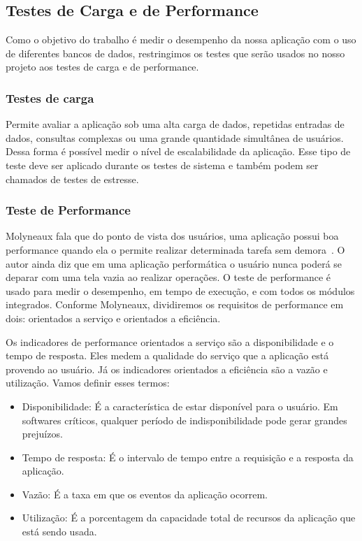 \subsection{Testes de Carga e de Performance}

Como o objetivo do trabalho é medir o desempenho da nossa aplicação com o uso de diferentes bancos de dados, restringimos os testes que serão usados no nosso projeto aos testes de carga e de performance.

\subsubsection{Testes de carga}

Permite avaliar a aplicação sob uma alta carga de dados, repetidas entradas de dados, consultas complexas ou uma grande quantidade simultânea de usuários. Dessa forma é possível medir o nível de escalabilidade da aplicação. Esse tipo de teste deve ser aplicado durante os testes de sistema e também podem ser chamados de testes de estresse.


\subsubsection{Teste de Performance}

Molyneaux fala que do ponto de vista dos usuários, uma aplicação possui boa performance quando ela o permite realizar determinada tarefa sem demora~\cite{theartoftestperf}. O autor ainda diz que em uma aplicação performática o usuário nunca poderá se deparar com uma tela vazia ao realizar operações. O teste de performance é usado para medir o desempenho, em tempo de execução, e com todos os módulos integrados. Conforme Molyneaux, dividiremos os requisitos de performance em dois: orientados a serviço e orientados a eficiência.

Os indicadores de performance orientados a serviço são a disponibilidade e o tempo de resposta. Eles medem a qualidade do serviço que a aplicação está provendo ao usuário. Já os indicadores orientados a eficiência são a vazão e utilização. Vamos definir esses termos:

\begin{itemize}
\item Disponibilidade: É a característica de estar disponível para o usuário. Em softwares críticos, qualquer período de indisponibilidade pode gerar grandes prejuízos.
\item Tempo de resposta: É o intervalo de tempo entre a requisição e a resposta da aplicação. 
\item Vazão: É a taxa em que os eventos da aplicação ocorrem.
\item Utilização: É a porcentagem da capacidade total de recursos da aplicação que está sendo usada.
\end{itemize}

